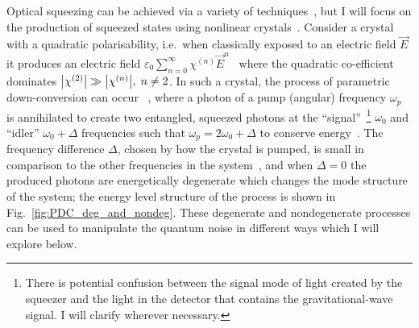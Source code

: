 Optical squeezing can be achieved via a variety of techniques~\cite{}, but I will focus on the production of squeezed states using nonlinear crystals~\cite{}. Consider a crystal with a quadratic polarisability, i.e.\ when classically exposed to an electric field $\vec E$ it produces an electric field $\varepsilon_0 \sum_{n=0}^\infty \chi^{(n)} {\vec E}^n$~\cite{theresNoRefinKirkthesis?}  where the quadratic co-efficient dominates $\abs{\chi^{(2)}}\gg\abs{\chi^{(n)}},\; n\neq2$. In such a crystal, the process of parametric down-conversion can occur~\cite{} , where a photon of a  pump (angular) frequency $\omega_p$ is annihilated to create two entangled, squeezed photons at the ``signal''~\footnote{There is potential confusion between the signal mode of light created by the squeezer and the light in the detector that contains the gravitational-wave signal. I will clarify wherever necessary.} $\omega_0$ and ``idler'' $\omega_0+\Delta$ frequencies such that $\omega_p=2\omega_0+\Delta$ to conserve energy~\cite{}. The frequency difference $\Delta$, chosen by how the crystal is pumped, is small in comparison to the other frequencies in the system~\cite{}, and when $\Delta=0$ the produced photons are energetically degenerate which changes the mode structure of the system; the energy level structure of the process is shown in Fig.~\ref{fig:PDC_deg_and_nondeg}. %
These degenerate and nondegenerate processes can be used to manipulate the quantum noise in different ways which I will explore below.


